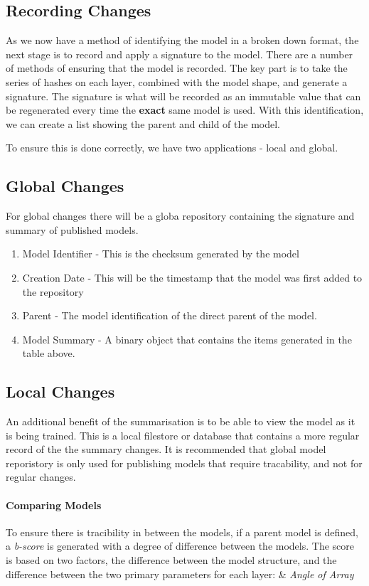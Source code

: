 \subsection{Recording Changes}
As we now have a method of identifying the model in a broken down format, the next stage is to record and apply a signature to the model. There are a number of methods of ensuring that the model is recorded. The key part is to take the series of hashes on each layer, combined with the model shape, and generate a signature. The signature is what will be recorded as an immutable value that can be regenerated every time the \textbf{exact} same model is used. With this identification, we can create a list showing the parent and child of the model.

To ensure this is done correctly, we have two applications - local and global.
\subsection{Global Changes}
For global changes there will be a globa repository containing the signature and summary of published models. 

\begin{enumerate}
    \item Model Identifier - This is the checksum generated by the model
    \item Creation Date - This will be the timestamp that the model was first added to the repository
    \item Parent - The model identification of the direct parent of the model.
    \item Model Summary - A binary object that contains the items generated in the table above.
    \end{enumerate}
\subsection{Local Changes}

An additional benefit of the summarisation is to be able to view the model as it is being trained. This is a local filestore or database that contains a more regular record of the the summary changes. It is recommended that global model reporistory is only used for publishing models that require tracability, and not for regular changes.

\paragraph*{Comparing Models}
To ensure there is tracibility in between the models, if a parent model is defined, a \textit{b-score} is generated with a degree of difference between the models. The score is based on two factors, the difference between the model structure, and the difference between the two primary parameters for each layer:  & \textit{Angle of Array}